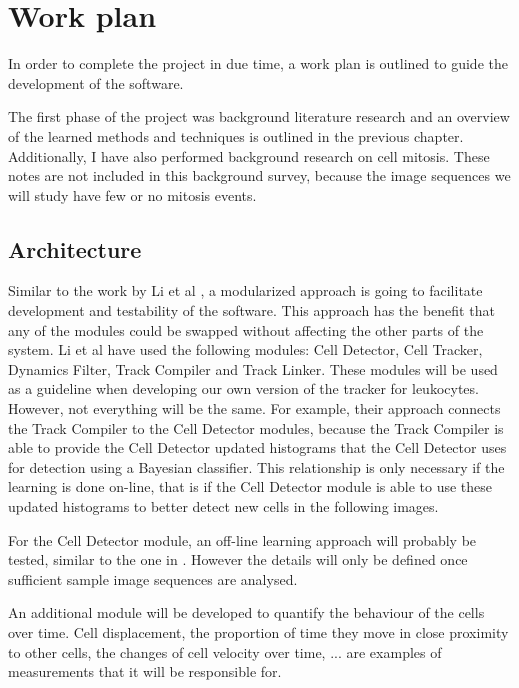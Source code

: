 \documentclass[12pt,a4paper,openany]{book}
\begin{document}
\chapter{Work plan}
\label{chap:workplan}

In order to complete the project in due time, a work plan is outlined to guide the development of the software.

The first phase of the project was background literature research and an overview of the learned methods and techniques is outlined in the previous chapter. Additionally, I have also performed background research on cell mitosis. These notes are not included in this background survey, because the image sequences we will study have few or no mitosis events.

\section{Architecture}

Similar to the work by Li et al \cite{li07}, a modularized approach is going to facilitate development and testability of the software. This approach has the benefit that any of the modules could be swapped without affecting the other parts of the system. Li et al have used the following modules: Cell Detector, Cell Tracker, Dynamics Filter, Track Compiler and Track Linker. These modules will be used as a guideline when developing our own version of the tracker for leukocytes. However, not everything will be the same. For example, their approach connects the Track Compiler to the Cell Detector modules, because the Track Compiler is able to provide the Cell Detector updated histograms that the Cell Detector uses for detection using a Bayesian classifier. This relationship is only necessary if the learning is done on-line, that is if the Cell Detector module is able to use these updated histograms to better detect new cells in the following images.

For the Cell Detector module, an off-line learning approach will probably be tested, similar to the one in \cite{arteta12}\cite{arteta13}. However the details will only be defined once sufficient sample image sequences are analysed.

An additional module will be developed to quantify the behaviour of the cells over time. Cell displacement, the proportion of time they move in close proximity to other cells, the changes of cell velocity over time, ... are examples of measurements that it will be responsible for.
\end{document}
